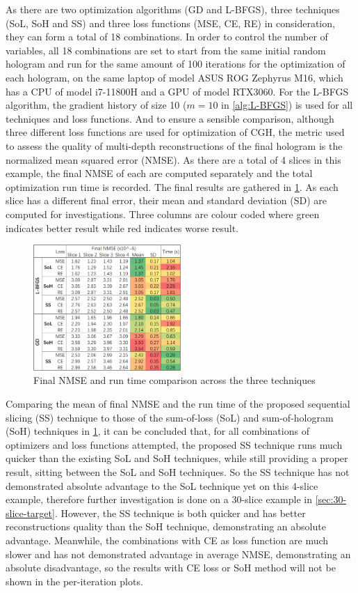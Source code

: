 As there are two optimization algorithms (GD and L-BFGS), three techniques (SoL, SoH and SS) and three loss functions (MSE, CE, RE) in consideration, they can form a total of 18 combinations. In order to control the number of variables, all 18 combinations are set to start from the same initial random hologram and run for the same amount of 100 iterations for the optimization of each hologram, on the same laptop of model ASUS ROG Zephyrus M16, which has a CPU of model i7-11800H and a GPU of model RTX3060. For the L-BFGS algorithm, the gradient history of size 10 ($m=10$ in \cref{alg:L-BFGS}) is used for all techniques and loss functions. And to ensure a sensible comparison, although three different loss functions are used for optimization of CGH, the metric used to assess the quality of multi-depth reconstructions of the final hologram is the normalized mean squared error (NMSE). As there are a total of 4 slices in this example, the final NMSE of each are computed separately and the total optimization run time is recorded. The final results are gathered in \cref{fig:Technique_Loss_comparison}. As each slice has a different final error, their mean and standard deviation (SD) are computed for investigations. Three columns are colour coded where green indicates better result while red indicates worse result.

\begin{figure}[h!]
	\centering
	\includegraphics[width=0.5\textwidth]{Technique_Loss_comparison}
	\caption{Final NMSE and run time comparison across the three techniques}
	\label{fig:Technique_Loss_comparison}
\end{figure}

Comparing the mean of final NMSE and the run time of the proposed sequential slicing (SS) technique to those of the sum-of-loss (SoL) and sum-of-hologram (SoH) techniques in \cref{fig:Technique_Loss_comparison}, it can be concluded that, for all combinations of optimizers and loss functions attempted, the proposed SS technique runs much quicker than the existing SoL and SoH techniques, while still providing a proper result, sitting between the SoL and SoH techniques. So the SS technique has not demonstrated absolute advantage to the SoL technique yet on this 4-slice example, therefore further investigation is done on a 30-slice example in \cref{sec:30-slice-target}. However, the SS technique is both quicker and has better reconstructions quality than the SoH technique, demonstrating an absolute advantage. Meanwhile, the combinations with CE as loss function are much slower and has not demonstrated advantage in average NMSE, demonstrating an absolute disadvantage, so the results with CE loss or SoH method will not be shown in the per-iteration plots.

